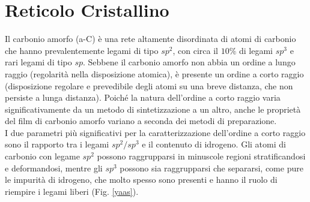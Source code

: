 \documentclass[a4paper,titlepage]{book}
\begin{document}
\section{Reticolo Cristallino}
Il carbonio amorfo (a-C) è una rete altamente disordinata di atomi di carbonio che hanno prevalentemente legami di tipo $sp^2$, con circa il $10\%$ di legami $sp^3$  e rari legami di tipo $sp$. Sebbene il carbonio amorfo non abbia un ordine a lungo raggio (regolarità nella disposizione atomica), è presente un ordine a corto raggio (disposizione regolare e prevedibile degli atomi su una breve distanza, che non persiste a lunga distanza). Poiché la natura dell'ordine a corto raggio varia significativamente da un metodo di sintetizzazione a un altro, anche le proprietà del film di carbonio amorfo variano a seconda dei metodi di preparazione.\\
I due parametri più significativi per la caratterizzazione dell'ordine a corto raggio sono il rapporto tra i legami $sp^2/sp^3$ e il contenuto di idrogeno. Gli atomi di carbonio con legame $sp^2$ possono raggrupparsi in minuscole regioni stratificandosi e deformandosi, mentre gli $sp^3$ possono sia raggrupparsi che separarsi, come pure le impurità di idrogeno, che molto spesso sono presenti e hanno il ruolo di riempire i legami liberi (Fig. \ref{yaas}).
\end{document}
